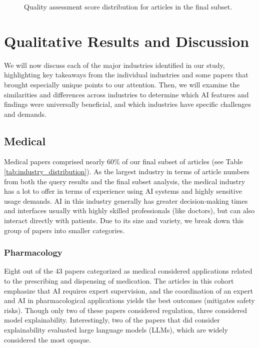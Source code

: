\documentclass[authoryear,preprint,12pt]{elsarticle}
\begin{document}
\begin{figure}[ht!]
    \centering
    \resizebox{0.8\textwidth}{!}{}
    \caption{Quality assessment score distribution for articles in the final subset.}
    \label{fig:qa_scores}
\end{figure}

\FloatBarrier

\section{Qualitative Results and Discussion}
\label{sec:qualitative_results}
We will now discuss each of the major industries identified in our study,
highlighting key takeaways from the individual industries and some papers that
brought especially unique points to our attention. Then, we will examine the
similarities and differences across industries to determine which AI features
and findings were universally beneficial, and which industries have specific
challenges and demands.

\subsection{Medical}
\label{sec:medical}
Medical papers comprised nearly 60\% of our final subset of articles (see Table
\ref{tab:industry_distribution}). As the largest industry in terms of article
numbers from both the query results and the final subset analysis, the medical
industry has a lot to offer in terms of experience using AI systems and highly
sensitive usage demands. AI in this industry generally has greater
decision-making times and interfaces usually with highly skilled professionals
(like doctors), but can also interact directly with patients. Due to its size
and variety, we break down this group of papers into smaller categories. 

\subsubsection{Pharmacology}
Eight out of the 43 papers categorized as medical considered applications
related to the prescribing and dispensing of medication. The articles in this
cohort emphasize that AI requires expert supervision, and the coordination of an
expert and AI in pharmacological applications yields the best outcomes
(mitigates safety risks). Though only two of these papers considered regulation,
three considered model explainability. Interestingly, two of the papers that did
consider explainability evaluated large language models (LLMs), which are widely
considered the most opaque. 
\end{document}
